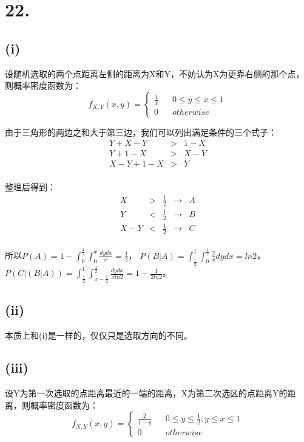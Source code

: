 \documentclass[UTF8]{report}
\begin{document}
    \section*{22.}
        \subsection*{(i)}
            设随机选取的两个点距离左侧的距离为X和Y，不妨认为X为更靠右侧的那个点，则概率密度函数为：
            $$f_{X, Y}(x, y) = \left\{
                \begin{array}{lcr}
                    \frac{1}{x} & & 0 \leq y \leq x \leq 1\\
                    0 & & otherwise
                \end{array}
            \right.$$

            由于三角形的两边之和大于第三边，我们可以列出满足条件的三个式子：
            $$\begin{array}{lcr}
                Y + X - Y & > & 1 - X\\
                Y + 1 - X & > & X - Y\\
                X - Y + 1 - X & > & Y\\
            \end{array}$$
            
            整理后得到：
            $$\begin{array}{lccrr}
                X & > & \frac{1}{2} & \rightarrow & A\\
                Y & < & \frac{1}{2} & \rightarrow & B\\
                X - Y & < & \frac{1}{2} & \rightarrow & C\\
            \end{array}$$

            所以$P(A) = 1 - \int_{0}^{\frac{1}{2}}\int_{0}^{x}\frac{dydx}{x} = \frac{1}{2}$，
            $P(B|A) = \int_{\frac{1}{2}}^{1}\int_{0}^{\frac{1}{2}}\frac{2}{x}dydx = ln2$，
            $P(C|(B|A)) = \int_{\frac{1}{2}}^{1}\int_{x - \frac{1}{2}}^{\frac{1}{2}}\frac{dydx}{xln2} = 1 - \frac{1}{2ln2}$。
        \subsection*{(ii)}
            本质上和(i)是一样的，仅仅只是选取方向的不同。
        \subsection*{(iii)}
            设Y为第一次选取的点距离最近的一端的距离，X为第二次选区的点距离Y的距离，则概率密度函数为：
            $$f_{X, Y}(x, y) = \left\{
                \begin{array}{lcr}
                    \frac{2}{1 - y} & & 0 \leq y \leq \frac{1}{2}, y \leq x \leq 1\\
                    0 & & otherwise
                \end{array}
            \right.$$
\end{document}
